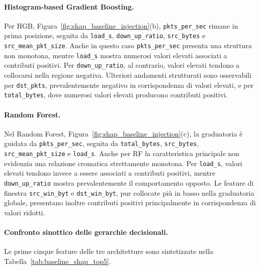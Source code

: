 \paragraph{Histogram-based Gradient Boosting.}
Per HGB, Figura~\ref{fig:shap_baseline_injection}(b), \texttt{pkts\_per\_sec} rimane in prima posizione, seguita da \texttt{load\_s}, \texttt{down\_up\_ratio}, \texttt{src\_bytes} e \texttt{src\_mean\_pkt\_size}. 
Anche in questo caso \texttt{pkts\_per\_sec} presenta una struttura non monotona, mentre \texttt{load\_s} mostra numerosi valori elevati associati a contributi positivi. 
Per \texttt{down\_up\_ratio}, al contrario, valori elevati tendono a collocarsi nella regione negativa. 
Ulteriori andamenti strutturati sono osservabili per \texttt{dst\_pkts}, prevalentemente negativo in corrispondenza di valori elevati, e per \texttt{total\_bytes}, dove numerosi valori elevati producono contributi positivi.

\paragraph{Random Forest.}
Nel Random Forest, Figura~\ref{fig:shap_baseline_injection}(c), la graduatoria è guidata da \texttt{pkts\_per\_sec}, seguita da \texttt{total\_bytes}, \texttt{src\_bytes}, \texttt{src\_mean\_pkt\_size} e \texttt{load\_s}. 
Anche per RF la caratteristica principale non evidenzia una relazione cromatica strettamente monotona. 
Per \texttt{load\_s}, valori elevati tendono invece a essere associati a contributi positivi, mentre \texttt{down\_up\_ratio} mostra prevalentemente il comportamento opposto. 
Le feature di finestra \texttt{src\_win\_byt} e \texttt{dst\_win\_byt}, pur collocate più in basso nella graduatoria globale, presentano inoltre contributi positivi principalmente in corrispondenza di valori ridotti.


\paragraph{Confronto sinottico delle gerarchie decisionali.}
Le prime cinque feature delle tre architetture sono sintetizzate nella
Tabella~\ref{tab:baseline_shap_top5}.


